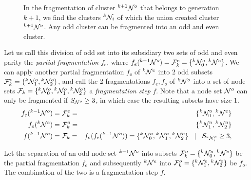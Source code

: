 \begin{figure}
  \caption{In the fragmentation of cluster ${}^{k+1}\mathcal{N}^o$ that belongs to generation $k+1$, we find the clusters ${}^{k}\mathcal{N}_i$ of which the union created cluster ${}^{k+1}\mathcal{N}^o$. Any odd cluster can be fragmented into an odd and even cluster.}\label{fig:generation}
\end{figure}
Let us call this division of odd set into its subsidiary two sets of odd and even parity the \emph{partial fragmentation} $f_e$, where $f_e({}^{k-1}\mathcal{N}^o) = \mathcal{F}^e_k = \{{}^{k}\mathcal{N}^o_0, {}^{k}\mathcal{N}^e\}$. We can apply another partial fragmentation $f_o$ of ${}^{k}\mathcal{N}^e$ into 2 odd subsets $\mathcal{F}^o_k=\{{}^{k}\mathcal{N}^{o}_1, {}^{k}\mathcal{N}^{o}_2\}$, and call the 2 fragmentations $f_e, f_o$ of ${}^{k}\mathcal{N}^o$ into a set of node sets $\mathcal{F}_k = \{{}^{k}\mathcal{N}^o_0, {}^{k}\mathcal{N}^{o}_1, {}^{k}\mathcal{N}^{o}_2\}$ a \emph{fragmentation step} $f$. Note that a node set $\mathcal{N}^o$ can only be fragmented if $S_{\mathcal{N}^o} \geq 3$, in which case the resulting subsets have size 1.
\begin{eqnarray}
  f_e({}^{k-1}\mathcal{N}^o) &= \mathcal{F}^e_k =& \{{}^{k}\mathcal{N}^o_0, {}^{k}\mathcal{N}^e\} \\
  f_o({}^{k}\mathcal{N}^e) &= \mathcal{F}^o_k =& \{{}^{k}\mathcal{N}^{o}_1, {}^{k}\mathcal{N}^{o}_2\} \\
  f({}^{k-1}\mathcal{N}^o) &= \mathcal{F}_k =& f_o(f_e({}^{k-1}\mathcal{N}^o)) = \{{}^{k}\mathcal{N}^o_0, {}^{k}\mathcal{N}^{o}_1, {}^{k}\mathcal{N}^{o}_2\} \hspace{.3cm} | \hspace{.3cm} S_{{}^{k}\mathcal{N}^o_i} \geq 3 \label{eq:partialfrag},
\end{eqnarray}

\begin{lemma}\label{lem:partialfrag}
  Let the separation of an odd node set ${}^{k-1}\mathcal{N}^o$ into subsets $\mathcal{F}_k^o=\{{}^{k}\mathcal{N}^o_0, {}^{k}\mathcal{N}^e\}$ be the partial fragmentation $f_e$ and subsequently ${}^{k}\mathcal{N}^e$ into  $\mathcal{F}_k^o=\{{}^{k}\mathcal{N}^o_1, {}^{k}\mathcal{N}^o_2\}$ be $f_o$. The combination of the two is a fragmentation step $f$.
\end{lemma}


